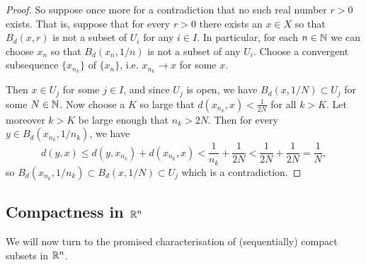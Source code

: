 \begin{proof}
  So suppose once more for a contradiction that no such real number $r > 0$ exists. That is, suppose that for every $r > 0$ there exists an $x \in X$ so that $B_d(x,r)$ is not a subset of $U_i$ for any $i \in I$. In particular, for each $n \in \mathbb{N}$ we can choose $x_n$ so that $B_d(x_n,1/n)$ is not a subset of any $U_i$. Choose a convergent subsequence $\{x_{n_k}\}$ of $\{x_n\}$, i.e. $x_{n_k} \to x$ for some $x$.
  
  Then $x \in U_j$ for some $j \in I$, and since $U_j$ is open, we have $B_d(x,1/N) \subset U_j$ for some $N \in \mathbb{N}$. Now choose a $K$ so large that $d(x_{n_k},x) < \tfrac{1}{2N}$ for all $k > K$. Let moreover $k > K$ be large enough that $n_k > 2N$. Then for every $y \in B_d(x_{n_k},1/n_k)$, we have
  \[
    d(y,x) \leq d(y,x_{n_k}) + d(x_{n_k},x) < \frac{1}{n_k} + \frac{1}{2N} < \frac{1}{2N} + \frac{1}{2N} = \frac{1}{N},
  \]
  so $B_d(x_{n_k},1/n_k) \subset B_d(x,1/N) \subset U_j$ which is a contradiction.
\end{proof}

\subsection{Compactness in $\mathbb{R}^n$}
We will now turn to the promised characterisation of (sequentially) compact subsets in $\mathbb{R}^n$.


